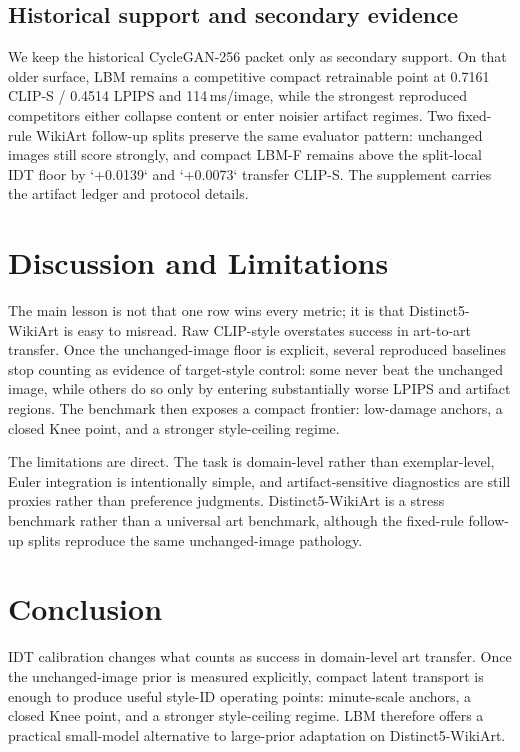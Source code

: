 \documentclass[letterpaper]{article}
\begin{document}
\subsection{Historical support and secondary evidence}
We keep the historical CycleGAN-256 packet only as secondary support. On that older surface, LBM remains a competitive compact retrainable point at 0.7161 CLIP-S / 0.4514 LPIPS and 114\,ms/image, while the strongest reproduced competitors either collapse content or enter noisier artifact regimes. Two fixed-rule WikiArt follow-up splits preserve the same evaluator pattern: unchanged images still score strongly, and compact LBM-F remains above the split-local IDT floor by `+0.0139` and `+0.0073` transfer CLIP-S. The supplement carries the artifact ledger and protocol details.



\section{Discussion and Limitations}
The main lesson is not that one row wins every metric; it is that Distinct5-WikiArt is easy to misread. Raw CLIP-style overstates success in art-to-art transfer. Once the unchanged-image floor is explicit, several reproduced baselines stop counting as evidence of target-style control: some never beat the unchanged image, while others do so only by entering substantially worse LPIPS and artifact regions. The benchmark then exposes a compact frontier: low-damage anchors, a closed Knee point, and a stronger style-ceiling regime.

The limitations are direct. The task is domain-level rather than exemplar-level, Euler integration is intentionally simple, and artifact-sensitive diagnostics are still proxies rather than preference judgments. Distinct5-WikiArt is a stress benchmark rather than a universal art benchmark, although the fixed-rule follow-up splits reproduce the same unchanged-image pathology.

\section{Conclusion}
IDT calibration changes what counts as success in domain-level art transfer. Once the unchanged-image prior is measured explicitly, compact latent transport is enough to produce useful style-ID operating points: minute-scale anchors, a closed Knee point, and a stronger style-ceiling regime. LBM therefore offers a practical small-model alternative to large-prior adaptation on Distinct5-WikiArt.
\end{document}
